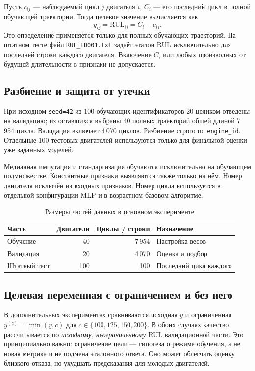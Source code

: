 \documentclass[12pt,a4paper]{article}
\begin{document}
Пусть $c_{ij}$ — наблюдаемый цикл $j$ двигателя $i$, $C_i$ — его последний цикл в полной обучающей траектории. Тогда целевое значение вычисляется как
\begin{equation}y_{ij}=\mathrm{RUL}_{ij}=C_i-c_{ij}.\end{equation}
Это определение применяется только для полных обучающих траекторий. На штатном тесте файл \texttt{RUL\_FD001.txt} задаёт эталон RUL исключительно для последней строки каждого двигателя. Включение $C_i$ или любых производных от будущей длительности в признаки не допускается.
\subsection{Разбиение и защита от утечки}
При исходном \texttt{seed=42} из 100 обучающих идентификаторов 20 целиком отведены на валидацию; из оставшихся выбраны 40 полных траекторий общей длиной 7\,954 цикла. Валидация включает 4\,070 циклов. Разбиение строго по \texttt{engine\_id}. Отдельные 100 тестовых двигателей используются только для финальной оценки уже заданных моделей.

Медианная импутация и стандартизация обучаются исключительно на обучающем подмножестве. Константные признаки выявляются также только на нём. Номер двигателя исключён из входных признаков. Номер цикла используется в отдельной конфигурации MLP и в возрастном базовом алгоритме.
\begin{table}[H]\centering\caption{Размеры частей данных в основном эксперименте}\begin{tabular}{lrrl}\toprule Часть & Двигатели & Циклы / строки & Назначение\\\midrule Обучение & 40 & 7\,954 & Настройка весов\\ Валидация & 20 & 4\,070 & Оценка и подбор\\ Штатный тест & 100 & 100 & Последний цикл каждого\\\bottomrule\end{tabular}\end{table}
\subsection{Целевая переменная с ограничением и без него}
В дополнительных экспериментах сравниваются исходная $y$ и ограниченная $y^{(c)}=\min(y,c)$ для $c\in\{100,125,150,200\}$. В обоих случаях качество рассчитывается по \emph{исходному, неограниченному} RUL валидационной части. Это принципиально важно: ограничение цели — гипотеза о режиме обучения, а не новая метрика и не подмена эталонного ответа. Оно может облегчать оценку близкого отказа, но ухудшать предсказания для молодых двигателей.
\end{document}
